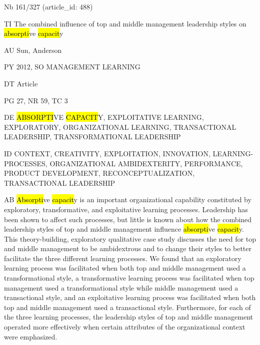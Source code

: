 \documentclass[a4paper]{article}
\begin{document}
\vspace*{-2cm}
Nb \tabto{0cm}161/327 (article\_id: 488)\par
TI \tabto{0cm}The combined influence of top and middle management leadership styles on \hl{absorpti}ve \hl{capacit}y\par
AU \tabto{0cm}Sun, Anderson\par
PY \tabto{0cm}2012, SO MANAGEMENT LEARNING\par
DT \tabto{0cm}Article\par
PG \tabto{0cm}27, NR 59, TC 3\par
DE \tabto{0cm}\hl{ABSORPTI}VE \hl{CAPACIT}Y, EXPLOITATIVE LEARNING, EXPLORATORY, ORGANIZATIONAL LEARNING, TRANSACTIONAL LEADERSHIP, TRANSFORMATIONAL LEADERSHIP\par
ID \tabto{0cm}CONTEXT, CREATIVITY, EXPLOITATION, INNOVATION, LEARNING-PROCESSES, ORGANIZATIONAL AMBIDEXTERITY, PERFORMANCE, PRODUCT DEVELOPMENT, RECONCEPTUALIZATION, TRANSACTIONAL LEADERSHIP\par
AB \tabto{0cm}\hl{Absorpti}ve \hl{capacit}y is an important organizational capability constituted by exploratory, transformative, and exploitative learning processes. Leadership has been shown to affect such processes, but little is known about how the combined leadership styles of top and middle management influence \hl{absorpti}ve \hl{capacit}y. This theory-building, exploratory qualitative case study discusses the need for top and middle management to be ambidextrous and to change their styles to better facilitate the three different learning processes. We found that an exploratory learning process was facilitated when both top and middle management used a transformational style, a transformative learning process was facilitated when top management used a transformational style while middle management used a transactional style, and an exploitative learning process was facilitated when both top and middle management used a transactional style. Furthermore, for each of the three learning processes, the leadership styles of top and middle management operated more effectively when certain attributes of the organizational context were emphasized.\par
\clearpage
\end{document}
